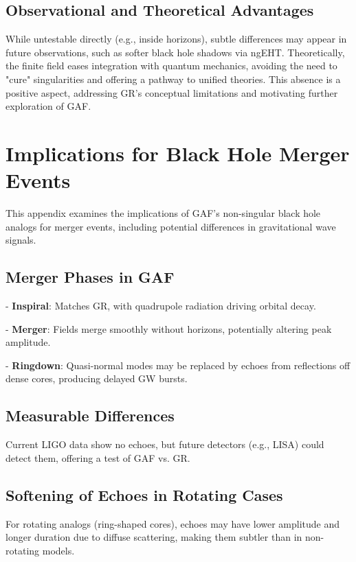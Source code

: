 \documentclass{article}
\begin{document}
\subsection{Observational and Theoretical Advantages}

While untestable directly (e.g., inside horizons), subtle differences may appear in future observations, such as softer black hole shadows via ngEHT. Theoretically, the finite field eases integration with quantum mechanics, avoiding the need to "cure" singularities and offering a pathway to unified theories. This absence is a positive aspect, addressing GR's conceptual limitations and motivating further exploration of GAF.

\section{Implications for Black Hole Merger Events}

This appendix examines the implications of GAF's non-singular black hole analogs for merger events, including potential differences in gravitational wave signals.

\subsection{Merger Phases in GAF}

- \textbf{Inspiral}: Matches GR, with quadrupole radiation driving orbital decay.

- \textbf{Merger}: Fields merge smoothly without horizons, potentially altering peak amplitude.

- \textbf{Ringdown}: Quasi-normal modes may be replaced by echoes from reflections off dense cores, producing delayed GW bursts.

\subsection{Measurable Differences}

Current LIGO data show no echoes, but future detectors (e.g., LISA) could detect them, offering a test of GAF vs. GR.

\subsection{Softening of Echoes in Rotating Cases}

For rotating analogs (ring-shaped cores), echoes may have lower amplitude and longer duration due to diffuse scattering, making them subtler than in non-rotating models.
\end{document}
